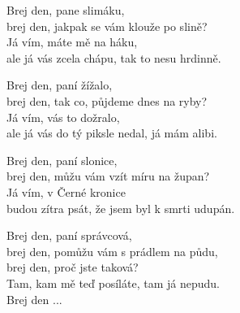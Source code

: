 
\ve{}
Brej den, pane slimáku,\\
brej den, jakpak se vám klouže po slině? \\
Já vím, máte mě na háku, \\
ale já vás zcela chápu, tak to nesu hrdinně. 

\ve{}
Brej den, paní žížalo, \\
brej den, tak co, půjdeme dnes na ryby? \\
Já vím, vás to dožralo, \\
ale já vás do tý piksle nedal, já mám alibi. 

\ve{}
Brej den, paní slonice, \\
brej den, můžu vám vzít míru na župan? \\
Já vím, v Černé kronice \\
budou zítra psát, že jsem byl k smrti udupán. 

\ve{}
Brej den, paní správcová, \\
brej den, pomůžu vám s prádlem na půdu, \\
brej den, proč jste taková? \\
Tam, kam mě teď posíláte, tam já nepudu. \\

Brej den ...

\esong
